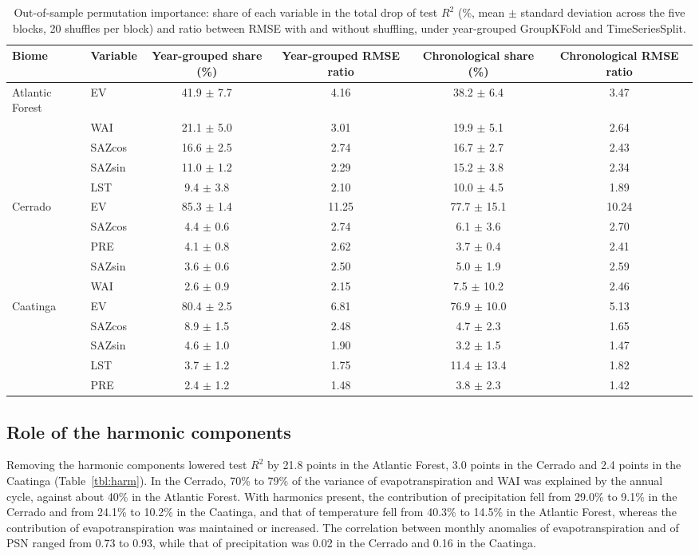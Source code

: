 \documentclass[a4paper,fleqn]{cas-sc}
\begin{document}
\begin{table}[htbp]
\caption{Out-of-sample permutation importance: share of each variable in the total drop of test $R^2$ (\%, mean $\pm$ standard deviation across the five blocks, 20 shuffles per block) and ratio between RMSE with and without shuffling, under year-grouped GroupKFold and TimeSeriesSplit.}\label{tbl:perm}
\footnotesize
\begin{tabular*}{\tblwidth}{@{}LLCCCC@{}}
\toprule
Biome & Variable & Year-grouped share (\%) & Year-grouped RMSE ratio & Chronological share (\%) & Chronological RMSE ratio \\
\midrule
Atlantic Forest & EV & 41.9 $\pm$ 7.7 & 4.16 & 38.2 $\pm$ 6.4 & 3.47 \\
 & WAI & 21.1 $\pm$ 5.0 & 3.01 & 19.9 $\pm$ 5.1 & 2.64 \\
 & SAZcos & 16.6 $\pm$ 2.5 & 2.74 & 16.7 $\pm$ 2.7 & 2.43 \\
 & SAZsin & 11.0 $\pm$ 1.2 & 2.29 & 15.2 $\pm$ 3.8 & 2.34 \\
 & LST & 9.4 $\pm$ 3.8 & 2.10 & 10.0 $\pm$ 4.5 & 1.89 \\
Cerrado & EV & 85.3 $\pm$ 1.4 & 11.25 & 77.7 $\pm$ 15.1 & 10.24 \\
 & SAZcos & 4.4 $\pm$ 0.6 & 2.74 & 6.1 $\pm$ 3.6 & 2.70 \\
 & PRE & 4.1 $\pm$ 0.8 & 2.62 & 3.7 $\pm$ 0.4 & 2.41 \\
 & SAZsin & 3.6 $\pm$ 0.6 & 2.50 & 5.0 $\pm$ 1.9 & 2.59 \\
 & WAI & 2.6 $\pm$ 0.9 & 2.15 & 7.5 $\pm$ 10.2 & 2.46 \\
Caatinga & EV & 80.4 $\pm$ 2.5 & 6.81 & 76.9 $\pm$ 10.0 & 5.13 \\
 & SAZcos & 8.9 $\pm$ 1.5 & 2.48 & 4.7 $\pm$ 2.3 & 1.65 \\
 & SAZsin & 4.6 $\pm$ 1.0 & 1.90 & 3.2 $\pm$ 1.5 & 1.47 \\
 & LST & 3.7 $\pm$ 1.2 & 1.75 & 11.4 $\pm$ 13.4 & 1.82 \\
 & PRE & 2.4 $\pm$ 1.2 & 1.48 & 3.8 $\pm$ 2.3 & 1.42 \\
\bottomrule
\end{tabular*}
\end{table}

\subsection{Role of the harmonic components}

Removing the harmonic components lowered test $R^2$ by 21.8 points in the Atlantic Forest, 3.0 points in the Cerrado and 2.4 points in the Caatinga (Table~\ref{tbl:harm}). In the Cerrado, 70\% to 79\% of the variance of evapotranspiration and WAI was explained by the annual cycle, against about 40\% in the Atlantic Forest. With harmonics present, the contribution of precipitation fell from 29.0\% to 9.1\% in the Cerrado and from 24.1\% to 10.2\% in the Caatinga, and that of temperature fell from 40.3\% to 14.5\% in the Atlantic Forest, whereas the contribution of evapotranspiration was maintained or increased. The correlation between monthly anomalies of evapotranspiration and of PSN ranged from 0.73 to 0.93, while that of precipitation was 0.02 in the Cerrado and 0.16 in the Caatinga.
\end{document}
